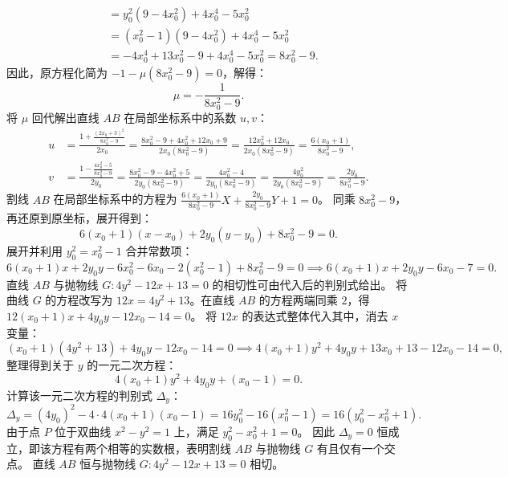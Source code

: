 \begin{solution}
\begin{align*}
&= y_0^2(9 - 4x_0^2) + 4x_0^4 - 5x_0^2 \\
&= (x_0^2 - 1)(9 - 4x_0^2) + 4x_0^4 - 5x_0^2 \\
&= -4x_0^4 + 13x_0^2 - 9 + 4x_0^4 - 5x_0^2 = 8x_0^2 - 9.
\end{align*}
因此，原方程化简为 $-1 - \mu(8x_0^2 - 9) = 0$，解得：
\[ \mu = -\frac{1}{8x_0^2 - 9}. \]
将 $\mu$ 回代解出直线 $AB$ 在局部坐标系中的系数 $u, v$：
\begin{align*}
u &= \frac{1 + \frac{(2x_0 + 3)^2}{8x_0^2 - 9}}{2x_0} = \frac{8x_0^2 - 9 + 4x_0^2 + 12x_0 + 9}{2x_0(8x_0^2 - 9)} = \frac{12x_0^2 + 12x_0}{2x_0(8x_0^2 - 9)} = \frac{6(x_0 + 1)}{8x_0^2 - 9}, \\
v &= \frac{1 - \frac{4x_0^2 - 5}{8x_0^2 - 9}}{2y_0} = \frac{8x_0^2 - 9 - 4x_0^2 + 5}{2y_0(8x_0^2 - 9)} = \frac{4x_0^2 - 4}{2y_0(8x_0^2 - 9)} = \frac{4y_0^2}{2y_0(8x_0^2 - 9)} = \frac{2y_0}{8x_0^2 - 9}.
\end{align*}
割线 $AB$ 在局部坐标系中的方程为 $\frac{6(x_0 + 1)}{8x_0^2 - 9}X + \frac{2y_0}{8x_0^2 - 9}Y + 1 = 0$。
同乘 $8x_0^2 - 9$，再还原到原坐标，展开得到：
\[ 6(x_0 + 1)(x - x_0) + 2y_0(y - y_0) + 8x_0^2 - 9 = 0. \]
展开并利用 $y_0^2 = x_0^2 - 1$ 合并常数项：
\[ 6(x_0 + 1)x + 2y_0 y - 6x_0^2 - 6x_0 - 2(x_0^2 - 1) + 8x_0^2 - 9 = 0 \implies 6(x_0 + 1)x + 2y_0 y - 6x_0 - 7 = 0. \]
直线 $AB$ 与抛物线 $G: 4y^2 - 12x + 13 = 0$ 的相切性可由代入后的判别式给出。
将曲线 $G$ 的方程改写为 $12x = 4y^2 + 13$。在直线 $AB$ 的方程两端同乘 $2$，得 $12(x_0 + 1)x + 4y_0 y - 12x_0 - 14 = 0$。
将 $12x$ 的表达式整体代入其中，消去 $x$ 变量：
\[ (x_0 + 1)(4y^2 + 13) + 4y_0 y - 12x_0 - 14 = 0 \implies 4(x_0 + 1)y^2 + 4y_0 y + 13x_0 + 13 - 12x_0 - 14 = 0, \]
整理得到关于 $y$ 的一元二次方程：
\[ 4(x_0 + 1)y^2 + 4y_0 y + (x_0 - 1) = 0. \]
计算该一元二次方程的判别式 $\Delta_y$：
\[ \Delta_y = (4y_0)^2 - 4 \cdot 4(x_0 + 1)(x_0 - 1) = 16y_0^2 - 16(x_0^2 - 1) = 16(y_0^2 - x_0^2 + 1). \]
由于点 $P$ 位于双曲线 $x^2 - y^2 = 1$ 上，满足 $y_0^2 - x_0^2 + 1 = 0$。
因此 $\Delta_y = 0$ 恒成立，即该方程有两个相等的实数根，表明割线 $AB$ 与抛物线 $G$ 有且仅有一个交点。
直线 $AB$ 恒与抛物线 $G: 4y^2 - 12x + 13 = 0$ 相切。
\end{solution}


